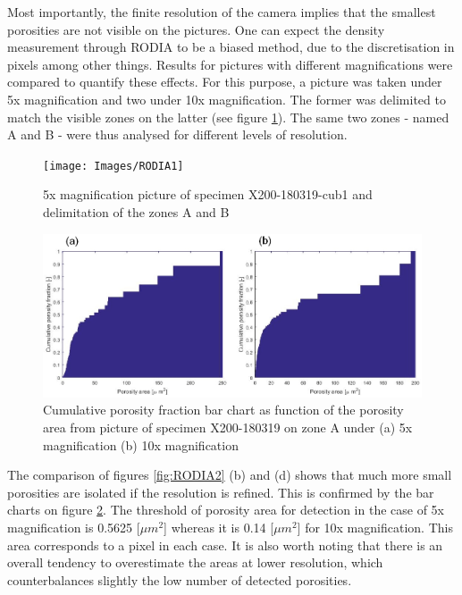 Most importantly, the finite resolution of the camera implies that the smallest porosities are not visible on the pictures. One can expect the density measurement through RODIA to be a biased method, due to the discretisation in pixels among other things. Results for pictures with different magnifications were compared to quantify these effects. For this purpose, a picture was taken under 5x magnification and two under 10x magnification. The former was delimited to match the visible zones on the latter (see figure \ref{fig:RODIA1}). The same two zones - named A and B - were thus analysed for different levels of resolution.\\

\begin{figure}[ht]
	\centering
	\centerline{\texttt{[image: Images/RODIA1]}}
	\decoRule
	\caption[5x magnification picture of specimen X200-180319-cub1 and delimitation of the zones A and B]{5x magnification picture of specimen X200-180319-cub1 and delimitation of the zones A and B}
	\label{fig:RODIA1}
\end{figure}

\begin{figure}[ht]
	\centering
	\centerline{\includegraphics[scale=0.7]{Images/CumSum}}
	\decoRule
	\caption[Cumulative porosity fraction bar chart as function of the porosity area from picture of specimen X200-180319 on zone A under (a) 5x magnification (b) 10x magnification]{Cumulative porosity fraction bar chart as function of the porosity area from picture of specimen X200-180319 on zone A under (a) 5x magnification (b) 10x magnification}
	\label{fig:CumSum}
\end{figure}


The comparison of figures \ref{fig:RODIA2} (b) and (d) shows that much more small porosities are isolated if the resolution is refined. This is confirmed by the bar charts on figure \ref{fig:CumSum}. The threshold of porosity area for detection in the case of 5x magnification is 0.5625 [$\mu m^2$] whereas it is 0.14 [$\mu m^2$] for 10x magnification. This area corresponds to a pixel in each case. It is also worth noting that there is an overall tendency to overestimate the areas at lower resolution, which counterbalances slightly the low number of detected porosities. \\


